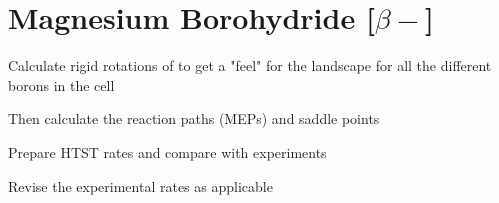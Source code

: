 \section{Magnesium Borohydride [$\beta-$]}
\label{sec:borohydrides-magnesium}

\ben
\item Calculate rigid rotations of  to get a "feel" for the landscape for all the different borons in the cell
\item Then calculate the reaction paths (MEPs) and saddle points
\item Prepare HTST rates and compare with experiments
\item Revise the experimental rates as applicable
\een

\placeholder

